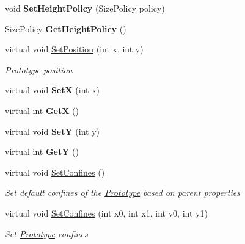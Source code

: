 \begin{DoxyCompactItemize}
\item 
\mbox{\label{class_space_v_i_l_1_1_prototype_a0aeca452bfc800cc699622d5d58cb20b}} 
void {\bfseries Set\+Height\+Policy} (Size\+Policy policy)
\item 
\mbox{\label{class_space_v_i_l_1_1_prototype_a0af844fee378d1a8f9d27a667558f15f}} 
Size\+Policy {\bfseries Get\+Height\+Policy} ()
\item 
virtual void \mbox{\hyperlink{class_space_v_i_l_1_1_prototype_a85ca4db19baa118edbb48eb93302a6b3}{Set\+Position}} (int x, int y)
\begin{DoxyCompactList}\small\item\em \mbox{\hyperlink{class_space_v_i_l_1_1_prototype}{Prototype}} position \end{DoxyCompactList}\item 
\mbox{\label{class_space_v_i_l_1_1_prototype_aab3faa479d644757467a5ffdd7804b8b}} 
virtual void {\bfseries SetX} (int x)
\item 
\mbox{\label{class_space_v_i_l_1_1_prototype_a68412539d75034d2ecfd6cb4d4edd9b1}} 
virtual int {\bfseries GetX} ()
\item 
\mbox{\label{class_space_v_i_l_1_1_prototype_a4a9b18b3946c7782bc06a859377362a4}} 
virtual void {\bfseries SetY} (int y)
\item 
\mbox{\label{class_space_v_i_l_1_1_prototype_a0395fe29a602379ca5b0d5b1b9b34168}} 
virtual int {\bfseries GetY} ()
\item 
virtual void \mbox{\hyperlink{class_space_v_i_l_1_1_prototype_af063fd80d51a3c42c8f43e0e97b6b809}{Set\+Confines}} ()
\begin{DoxyCompactList}\small\item\em Set default confines of the \mbox{\hyperlink{class_space_v_i_l_1_1_prototype}{Prototype}} based on parent properties \end{DoxyCompactList}\item 
virtual void \mbox{\hyperlink{class_space_v_i_l_1_1_prototype_ac409209f9adab44b149b5dff41bb2b00}{Set\+Confines}} (int x0, int x1, int y0, int y1)
\begin{DoxyCompactList}\small\item\em Set \mbox{\hyperlink{class_space_v_i_l_1_1_prototype}{Prototype}} confines \end{DoxyCompactList}\item 

\end{DoxyCompactItemize}

